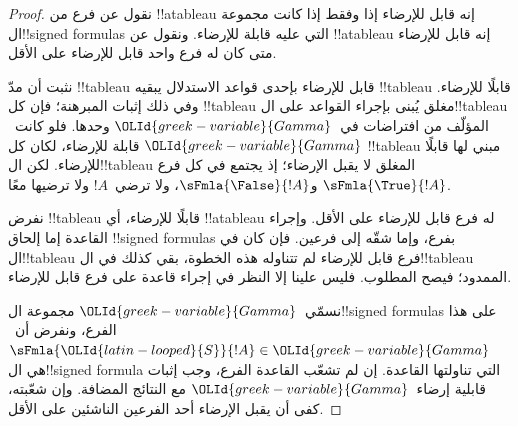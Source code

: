\documentclass[../../../include/open-logic-section]{subfiles}
\begin{document}
\begin{proof}
نقول عن فرع من !!a{tableau} إنه قابل للإرضاء إذا وفقط إذا كانت
مجموعة ال!!{signed formula}s التي عليه قابلة للإرضاء.
ونقول عن !!a{tableau} إنه قابل للإرضاء متى كان له فرع واحد
قابل للإرضاء على الأقل.

نثبت أن مدّ !!{tableau} قابل للإرضاء بإحدى قواعد الاستدلال
يبقيه !!{tableau} قابلًا للإرضاء. وفي ذلك إثبات المبرهنة؛
فإن كل !!{tableau} مغلق يُبنى بإجراء القواعد على ال!!{tableau}
المؤلّف من افتراضات في~$\OLId{greek-variable}{Gamma}$ وحدها. فلو كانت~$\OLId{greek-variable}{Gamma}$ قابلة
للإرضاء، لكان كل !!{tableau} مبني لها قابلًا للإرضاء.
لكن ال!!{tableau} المغلق لا يقبل الإرضاء؛ إذ يجتمع في كل فرع
$\sFmla{\True}{!A}$ و$\sFmla{\False}{!A}$، ولا
 ترضي~$!A$ ولا ترضيها معًا.

نفرض !!{tableau} قابلًا للإرضاء، أي !!a{tableau} له فرع قابل
للإرضاء على الأقل. وإجراء القاعدة إما إلحاق !!{signed formula}s
بفرع، وإما شقّه إلى فرعين. فإن كان في ال!!{tableau} فرع قابل
للإرضاء لم تتناوله هذه الخطوة، بقي كذلك في ال!!{tableau} الممدود؛
فيصح المطلوب. فليس علينا إلا النظر في إجراء قاعدة على فرع قابل
للإرضاء.

نسمّي~$\OLId{greek-variable}{Gamma}$ مجموعة ال!!{signed formula}s على هذا الفرع،
ونفرض أن~$\sFmla{\OLId{latin-looped}{S}}{!A} \in \OLId{greek-variable}{Gamma}$ هي ال!!{signed formula}
التي تناولتها القاعدة. إن لم تشعّب القاعدة الفرع، وجب إثبات
قابلية إرضاء~$\OLId{greek-variable}{Gamma}$ مع النتائج المضافة. وإن شعّبته،
كفى أن يقبل الإرضاء أحد الفرعين الناشئين على الأقل.


\end{proof}
\end{document}
